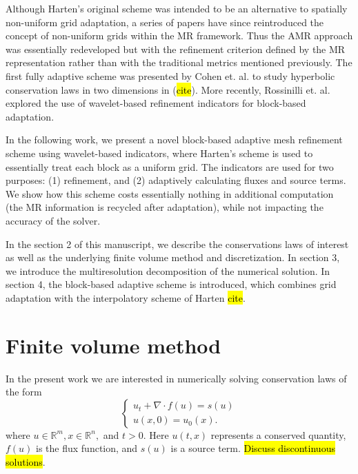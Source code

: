 \documentclass[]{article}
\begin{document}
    Although Harten's original scheme was intended to be an alternative to
    spatially non-uniform grid adaptation, a series of papers have since
    reintroduced the concept of non-uniform grids within the MR framework. Thus
    the AMR approach was essentially redeveloped but with the refinement
    criterion defined by the MR representation rather than with the traditional
    metrics mentioned previously. The first fully adaptive scheme was presented
    by Cohen et. al. to study hyperbolic conservation laws in two dimensions in
    (\hl{cite}). More recently, Rossinilli et. al. explored the use of
    wavelet-based refinement indicators for block-based adaptation.

    In the following work, we present a novel block-based adaptive mesh
    refinement scheme using wavelet-based indicators, where Harten's scheme is
    used to essentially treat each block as a uniform grid.  The indicators are
    used for two purposes: (1) refinement, and (2) adaptively calculating fluxes
    and source terms. We show how this scheme costs essentially nothing in
    additional computation (the MR information is recycled after adaptation),
    while not impacting the accuracy of the solver.

    In the section 2 of this manuscript, we describe the conservations laws
    of interest as well as the underlying finite volume
    method and discretization. In section 3, we introduce the multiresolution
    decomposition of the numerical solution. In section 4, the block-based
    adaptive scheme is introduced, which combines grid adaptation with the
    interpolatory scheme of Harten \hl{cite}.

\section{Finite volume method}

    In the present work we are interested in numerically solving conservation
    laws of the form
    \begin{equation}
    \begin{cases}
      u_{t} + \nabla \cdot f(u) = s(u) \\
      u(x,0) = u_{0}(x).
    \end{cases}
    \label{claw}
    \end{equation}
    where $u \in \mathbb{R}^{m}, x \in \mathbb{R}^{n},$ and $t > 0$. Here
    $u(t,x)$ represents a conserved quantity, $f(u)$ is the flux function, and
    $s(u)$ is a source term. \hl{Discuss discontinuous solutions}.
\end{document}
